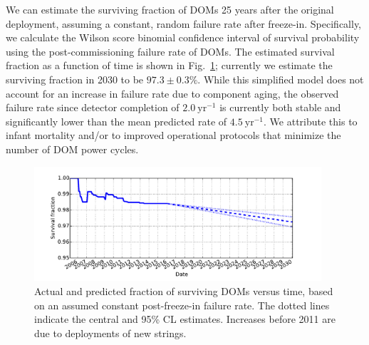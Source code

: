 We can estimate the surviving fraction of DOMs 25 years after the original
deployment, assuming a constant, random failure rate after freeze-in.
Specifically, we calculate the Wilson score binomial confidence interval \cite{Wilson_Score} of
survival probability using the post-commissioning failure rate of DOMs.
The estimated survival fraction as a function of 
time is shown in Fig.~\ref{fig:dom_survival}; currently we estimate the
surviving fraction in 2030 to be $97.3\pm0.3\%$.  While this simplified
model does not account for an increase in failure rate due to component aging, the
observed failure rate since detector completion of $2.0~\mathrm{yr}^{-1}$ is
currently both stable and significantly lower than the mean predicted rate
of $4.5~\mathrm{yr}^{-1}$.  We attribute 
this to infant mortality and/or to improved operational protocols that
minimize the number of DOM power cycles.

\begin{figure}[!h]
 \centering
 \includegraphics[width=0.95\textwidth]{graphics/dom/reliability/dom_survival.pdf}
 \caption{Actual and predicted fraction of surviving DOMs versus time, based on an assumed
 constant post-freeze-in failure rate.  The dotted lines indicate the
 central and 95\% CL estimates.  Increases before 2011 are due
 to deployments of new strings.} 
 \label{fig:dom_survival}
\end{figure}
